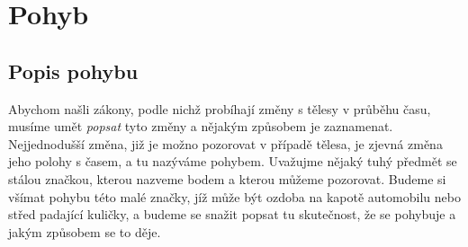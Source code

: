 \chapter{Pohyb}\label{chap:fey_move}
\minitoc
  \section{Popis pohybu}
    Abychom našli zákony, podle nichž probíhají změny s tělesy v průběhu času, musíme umět 
    \emph{popsat} tyto změny a nějakým způsobem je zaznamenat. Nejjednodušší změna, již je možno 
    pozorovat v případě tělesa, je zjevná změna jeho polohy s časem, a tu nazýváme pohybem. 
    Uvažujme nějaký tuhý předmět se stálou značkou, kterou nazveme bodem a kterou můžeme pozorovat. 
    Budeme si všímat pohybu této malé značky, jíž může být ozdoba na kapotě automobilu nebo střed 
    padající kuličky, a budeme se snažit popsat tu skutečnost, že se pohybuje a jakým způsobem se 
    to děje.

